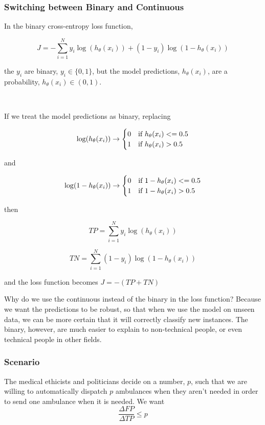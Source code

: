\subsubsection{Switching between Binary and Continuous}

In the binary cross-entropy loss function, 

$$J = -\sum_{i=1}^N y_i \log( h_\theta (x_i)) + (1-y_i) \log( 1 - h_\theta (x_i))$$

the $y_i$ are binary, $y_i \in \{0,1\}$, but the model predictions, $h_\theta (x_i)$, are a probability, $h_\theta(x_i) \in (0,1)$.  


\

If we treat the model predictions as binary, replacing 

$$
\log ( h_\theta(x_i)) \to 
\begin{cases}
	0 & \text{if } h_\theta(x_i) <= 0.5 \cr
	1 & \text{if } h_\theta(x_i) > 0.5 \cr
\end{cases}
$$

and

$$
\log ( 1 -  h_\theta(x_i)) \to 
\begin{cases}
	0 & \text{if } 1 - h_\theta(x_i) <= 0.5 \cr
	1 & \text{if } 1 - h_\theta(x_i) > 0.5 \cr
\end{cases}
$$

then 

$$ TP = \sum_{i=1}^N y_i \log( h_\theta (x_i))$$

$$ TN = \sum_{i=1}^N  (1-y_i) \log( 1 - h_\theta (x_i))$$

and the loss function becomes $J = -(TP+TN)$

Why do we use the continuous instead of the binary in the loss function?  Because we want the predictions to be robust, so that when we use the model on unseen data, we can be more certain that it will correctly classify new instances.  The binary, however, are much easier to explain to non-technical people, or even technical people in other fields.  

\subsubsection{Scenario}

The medical ethicists and politicians decide on a number, $p$, such that we are willing to automatically dispatch $p$ ambulances when they aren't needed in order to send one ambulance when it is needed.   We want $$ \frac{\Delta FP}{\Delta TP} \le p$$

